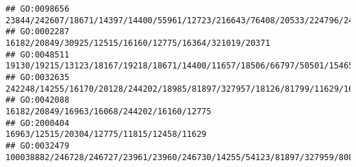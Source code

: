\documentclass[
]{article}
\begin{document}
\begin{verbatim}
## GO:0098656                                                                                                                                                                                                                                                                                                                                   23844/242607/18671/14397/14400/55961/12723/216643/76408/20533/224796/24115
## GO:0002287                                                                                                                                                                                                                                                                                                                                                       16182/20849/30925/12515/16160/12775/16364/321019/20371
## GO:0048511                                                                                                                                                                                                                                                                      19130/19215/13123/18167/19218/18671/14400/11657/18506/66797/50501/15465/21990/104158/432530/18126/18053/217369/213311/15117/13078/15566
## GO:0032635                                                                                                                                                                                                                                                                                                                       242248/14255/16170/20128/244202/18985/81897/327957/18126/81799/11629/16149/20371/12229
## GO:0042088                                                                                                                                                                                                                                                                                                                                                                   16182/20849/16963/16068/244202/16160/12775
## GO:2000404                                                                                                                                                                                                                                                                                                                                                                    16963/12515/20304/12775/11815/12458/11629
## GO:0032479                                                                                                                                                                                                                                                                                                                              100038882/246728/246727/23961/23960/246730/14255/54123/81897/327959/80861/12475

\end{verbatim}
\end{document}
